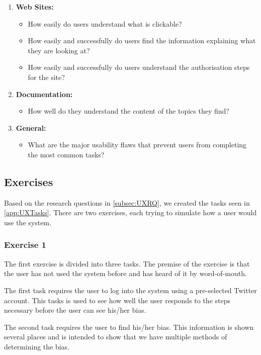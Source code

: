\begin{enumerate}
  \item \textbf{Web Sites:} 
	\begin{itemize}
      \item How easily do users understand what is clickable?
      \item How easily and successfully do users find the information
      explaining what they are looking at?
      \item How easily and successfully do users understand the authorisation
      steps for the site?
    \end{itemize}
  \item \textbf{Documentation:}
    \begin{itemize}
      \item How well do they understand the content of the topics they find?
    \end{itemize}
  \item \textbf{General:}
    \begin{itemize}
      \item What are the major usability flaws that prevent users from
      completing the most common tasks?
    \end{itemize}
\end{enumerate}

\subsection{Exercises}
Based on the research questions in \autoref{subsec:UXRQ}, we created the tasks
seen in \autoref{app:UXTasks}. There are two exercises, each trying to simulate
how a user would use the system.\nl

\subsubsection{Exercise 1}\label{subsub:UXE1}
The first exercise is divided into three tasks. The premise of the exercise is
that the user has not used the system before and has heard of it by
word-of-mouth.\nl

The first task requires the user to log into the system using a
pre-selected Twitter account. This tasks is used to see how well the user
responds to the steps necessary before the user can see his/her
bias.\nl

The second task requires the user to find his/her bias. This information is
shown several places and is intended to show that we have multiple methods of
determining the bias.\nl

